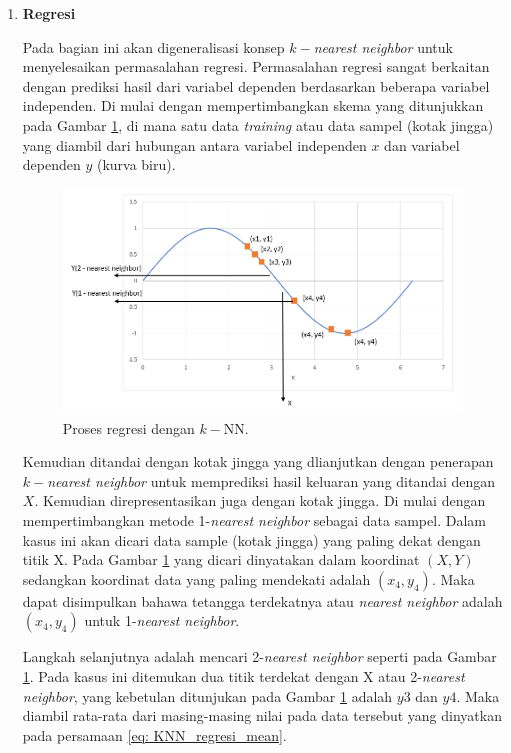 \begin{enumerate}[label=\textbf{\alph*).}]
	\item \textbf{Regresi}
	
	Pada bagian ini akan digeneralisasi konsep $k-$\textit{nearest neighbor} untuk menyelesaikan permasalahan regresi. Permasalahan regresi sangat berkaitan dengan prediksi hasil dari variabel dependen berdasarkan beberapa variabel independen. Di mulai dengan mempertimbangkan skema yang ditunjukkan pada Gambar \ref{fig:k-nn_sinosoid}, di mana satu data \textit{training} atau data sampel (kotak jingga) yang diambil dari hubungan antara variabel independen $x$ dan variabel dependen $y$ (kurva biru). 
	
	\begin{figure} [!h] \centering
		\includegraphics[scale=0.6]{img/k-nn_sinosoid.png}
		\caption{Proses regresi dengan $k-$NN.}
		\label{fig:k-nn_sinosoid}
	\end{figure}
	
	Kemudian ditandai dengan kotak jingga yang dlianjutkan dengan penerapan $k-$\textit{nearest neighbor} untuk memprediksi hasil keluaran yang ditandai dengan $X$. Kemudian direpresentasikan juga dengan kotak jingga. Di mulai dengan mempertimbangkan metode 1-\textit{nearest neighbor} sebagai data sampel. Dalam kasus ini akan dicari data sample (kotak jingga) yang paling dekat dengan titik X. Pada Gambar \ref{fig:k-nn_sinosoid} yang dicari dinyatakan dalam koordinat $(X, Y)$ sedangkan koordinat data yang paling mendekati adalah $(x_{4}, y_{4})$. Maka dapat disimpulkan bahawa tetangga terdekatnya atau \textit{nearest neighbor} adalah $(x_{4}, y_{4})$ untuk 1-\textit{nearest neighbor}.
	\vspace{1ex}
	
	Langkah selanjutnya adalah mencari 2-\textit{nearest neighbor} seperti pada Gambar \ref{fig:k-nn_sinosoid}. Pada kasus ini ditemukan dua titik terdekat dengan X atau 2-\textit{nearest neighbor}, yang kebetulan ditunjukan pada Gambar \ref{fig:k-nn_sinosoid} adalah $y3$ dan $y4$. Maka diambil rata-rata dari masing-masing nilai pada data tersebut yang dinyatkan pada persamaan \ref{eq: KNN_regresi_mean}.
	

\end{enumerate}

